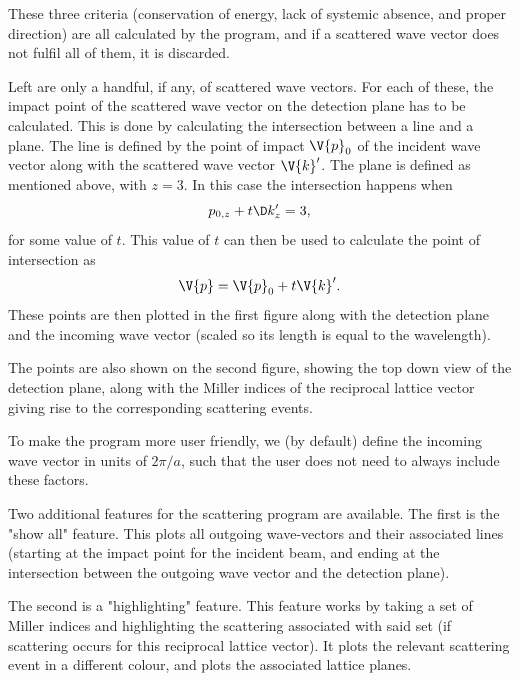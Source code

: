 \documentclass[main.tex]{subfiles}
\begin{document}
	These three criteria (conservation of energy, lack of systemic absence, and proper direction) are all calculated by the program, and if a scattered wave vector does not fulfil all of them, it is discarded.
	
	Left are only a handful, if any, of scattered wave vectors. For each of these, the impact point of the scattered wave vector on the detection plane has to be calculated. This is done by calculating the intersection between a line and a plane. The line is defined by the point of impact $ \V{p}_0 $ of the incident wave vector along with the scattered wave vector $ \V{k}' $. The plane is defined as mentioned above, with $ z=3 $. In this case the intersection happens when
	\begin{equation}
		p_{0,z} + t\D k'_z = 3,
	\end{equation}
	for some value of $ t $. This value of $ t $ can then be used to calculate the point of intersection as
	\begin{equation}
		\V{p} = \V{p}_0 + t \V{k}'.
	\end{equation}
	These points are then plotted in the first figure along with the detection plane and the incoming wave vector (scaled so its length is equal to the wavelength).
	
	The points are also shown on the second figure, showing the top down view of the detection plane, along with the Miller indices of the reciprocal lattice vector giving rise to the corresponding scattering events.
	
	To make the program more user friendly, we (by default) define the incoming wave vector in units of $ 2\pi/a $, such that the user does not need to always include these factors.
	
	Two additional features for the scattering program are available. The first is the "show all" feature. This plots all outgoing wave-vectors and their associated lines (starting at the impact point for the incident beam, and ending at the intersection between the outgoing wave vector and the detection plane).
	
	The second is a "highlighting" feature. This feature works by taking a set of Miller indices and highlighting the scattering associated with said set (if scattering occurs for this reciprocal lattice vector). It plots the relevant scattering event in a different colour, and plots the associated lattice planes.
	
\end{document}
